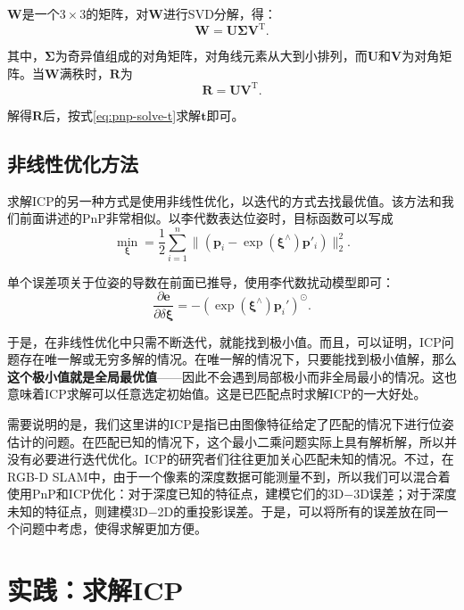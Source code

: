 $\bm{W}$是一个$3 \times 3$的矩阵，对$\bm{W}$进行SVD分解，得：
\begin{equation}
\bm{W} = \bm{U \Sigma V}^\mathrm{T}.
\end{equation}

其中，$\bm{\Sigma}$为奇异值组成的对角矩阵，对角线元素从大到小排列，而$\bm{U}$和$\bm{V}$为对角矩阵。当$\bm{W}$满秩时，$\bm{R}$为
\begin{equation}
\bm{R} = \bm{U} \bm{V}^\mathrm{T}.
\end{equation}

解得$\bm{R}$后，按式\eqref{eq:pnp-solve-t}求解$\bm{t}$即可。

\subsection{非线性优化方法}
求解ICP的另一种方式是使用非线性优化，以迭代的方式去找最优值。该方法和我们前面讲述的PnP非常相似。以李代数表达位姿时，目标函数可以写成
\begin{equation}
\mathop {\min }\limits_{\bm{\xi}} = \frac{1}{2} \sum\limits_{i = 1}^n\| {\left( {{{\bm{p}}_i} - \exp \left( \bm{\xi}^\wedge \right) {\bm{p}}'_i} \right)} \|^2_2.
\end{equation}

单个误差项关于位姿的导数在前面已推导，使用李代数扰动模型即可：
\begin{equation}
\frac{{\partial \bm{e}}}{{\partial \delta \bm{\xi} }} =  - {\left( {\exp \left( {{ \bm{\xi} ^ \wedge }} \right){{\bm{p}}_i}'} \right)^ \odot }.
\end{equation}

于是，在非线性优化中只需不断迭代，就能找到极小值。而且，可以证明\textsuperscript{\cite{Barfoot2016}}，ICP问题存在唯一解或无穷多解的情况。在唯一解的情况下，只要能找到极小值解，那么\textbf{这个极小值就是全局最优值}——因此不会遇到局部极小而非全局最小的情况。这也意味着ICP求解可以任意选定初始值。这是已匹配点时求解ICP的一大好处。

需要说明的是，我们这里讲的ICP是指已由图像特征给定了匹配的情况下进行位姿估计的问题。在匹配已知的情况下，这个最小二乘问题实际上具有解析解\textsuperscript{\cite{Faugeras1986, Horn1987, Sharp2002}}，所以并没有必要进行迭代优化。ICP的研究者们往往更加关心匹配未知的情况。不过，在RGB-D SLAM中，由于一个像素的深度数据可能测量不到，所以我们可以混合着使用PnP和ICP优化：对于深度已知的特征点，建模它们的3D−3D误差；对于深度未知的特征点，则建模3D−2D的重投影误差。于是，可以将所有的误差放在同一个问题中考虑，使得求解更加方便。

\section{实践：求解ICP}
